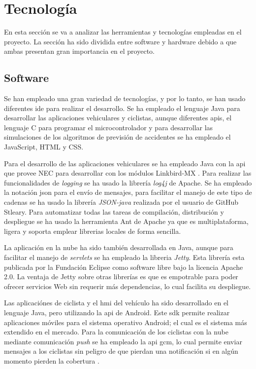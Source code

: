 \section{Tecnología}
En esta sección se va a analizar las herramientas y tecnologías empleadas en
el proyecto. La sección ha sido dividida entre software y hardware debido a que
ambas presentan gran importancia en el proyecto.

\subsection{Software}
Se han empleado una gran variedad de tecnologías, y por lo tanto, se han usado
diferentes \gls{ide} para realizar el desarrollo. Se ha empleado el lenguaje
Java para desarrollar las aplicaciones vehiculares y ciclistas, aunque
diferentes \gls{api}s, el lenguaje C para programar el microcontrolador y
para desarrollar las simulaciones de los algoritmos de previsión de accidentes
se ha empleado el JavaScript, HTML y CSS.

Para el desarrollo de las aplicaciones vehiculares se ha empleado Java con la
\gls{api} que provee NEC para desarrollar con los módulos Linkbird-MX
\cite{linkbird}. Para realizar las funcionalidades de \emph{logging} se ha
usado la librería \emph{log4j} de Apache. Se ha empleado la notación \gls{json}
para el envío de mensajes, para facilitar el manejo de este tipo de cadenas se
ha usado la librería \emph{JSON-java} realizada por el usuario de GitHub
Stleary. Para automatizar todas las tareas de compilación, distribución y
despliegue se ha usado la herramienta Ant de Apache ya que es multiplataforma,
ligera y soporta emplear librerias locales de forma sencilla.

La aplicación en la nube ha sido también desarrollada en Java, aunque para
facilitar el manejo de \emph{servlets} se ha empleado la libreria \emph{Jetty}.
Esta librería esta publicada por la Fundación Eclipse como software libre
bajo la licencia Apache 2.0. La ventaja de Jetty sobre otras librerías es que
es empotrable para poder ofrecer servicios Web sin requerir más dependencias,
lo cual facilita su despliegue.

Las aplicaciónes de ciclista y el \gls{hmi} del vehículo ha sido desarrollado
en el lenguaje Java, pero utilizando la \gls{api} de Android. Este \gls{sdk}
permite realizar aplicaciones móviles para el sistema operativo Android; el
cual es el sistema más extendido en el mercado. Para la comunicación de los
ciclistas con la nube mediante comunicación \emph{push} se ha empleado la
\gls{api} \gls{gcm}, lo cual permite enviar mensajes a los ciclistas sin
peligro de que pierdan una notificación si en algún momento pierden la
cobertura \cite{gcm}.

